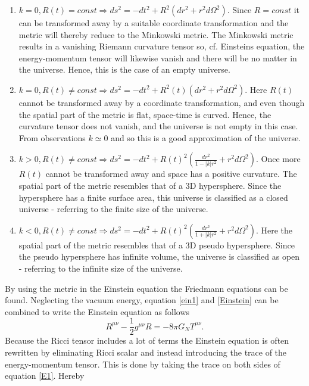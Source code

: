 \begin{enumerate}
	\item $k=0, R(t)=const\Rightarrow ds^2=-dt^2+R^2(dr^2+r^2d\Omega^2)$. Since $R=const$ it can be transformed away by a suitable coordinate transformation and the metric will thereby reduce to the Minkowski metric. The Minkowski metric results in a vanishing Riemann curvature tensor so, cf. Einsteins equation, the energy-momentum tensor will likewise vanish and there will be no matter in the universe. Hence, this is the case of an empty universe.
	
	\item $k=0, R(t)\neq const\Rightarrow ds^2=-dt^2+R^2(t)(dr^2+r^2d\Omega^2)$. Here $R(t)$ cannot be transformed away by a coordinate transformation, and even though the spatial part of the metric is flat, space-time is curved. Hence, the curvature tensor does not vanish, and the universe is not empty in this case. From observations $k\simeq 0$ and so this is a good approximation of the universe.
	
	\item $k>0, R(t)\neq const\Rightarrow ds^2=-dt^2+R(t)^2(\frac{dr^2}{1-|k|r^2}+r^2d\Omega^2)$. Once more $R(t)$ cannot be transformed away and space has a positive curvature. The spatial part of the metric resembles that of a 3D hypersphere. Since the hypersphere has a finite surface area, this universe is classified as a closed universe - referring to the finite size of the universe.
	
	\item $k<0, R(t)\neq const\Rightarrow ds^2=-dt^2+R(t)^2(\frac{dr^2}{1+|k|r^2}+r^2d\Omega^2)$. Here the spatial part of the metric resembles that of a 3D pseudo hypersphere. Since the pseudo hypersphere has infinite volume, the universe is classified as open - referring to the infinite size of the universe.
	
\end{enumerate}
By using the metric in the Einstein equation the Friedmann equations can be found. Neglecting the vacuum energy, equation \eqref{ein1} and \eqref{Einstein} can be combined to write the Einstein equation as follows
\begin{equation}
	R^{\mu\nu}-\frac{1}{2}g^{\mu\nu}R=-8\pi G_NT^{\mu\nu}.
	\label{E1}
\end{equation} 
Because the Ricci tensor includes a lot of terms the Einstein equation is often rewritten by eliminating Ricci scalar and instead introducing the trace of the energy-momentum tensor. This is done by taking the trace on both sides of equation \eqref{E1}. Hereby
